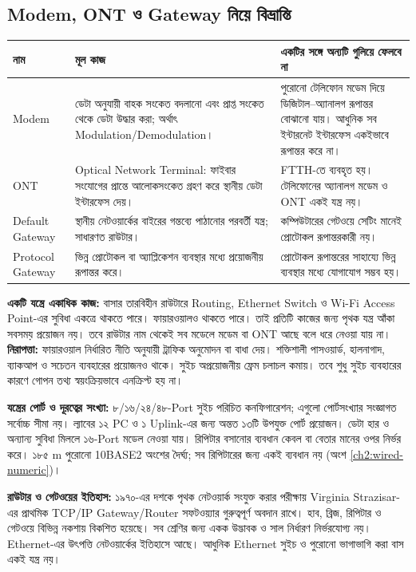 \subsection{Modem, ONT ও Gateway নিয়ে বিভ্রান্তি}
\begin{tabularx}{\linewidth}{|p{.21\linewidth}|X|X|}
\hline
\textbf{নাম} & \textbf{মূল কাজ} & \textbf{একটির সঙ্গে অন্যটি গুলিয়ে ফেলবে না}\\\hline
Modem & ডেটা অনুযায়ী বাহক সংকেত বদলানো এবং প্রাপ্ত সংকেত থেকে ডেটা উদ্ধার করা; অর্থাৎ Modulation/Demodulation। & পুরোনো টেলিফোন মডেম দিয়ে ডিজিটাল–অ্যানালগ রূপান্তর বোঝানো যায়। আধুনিক সব ইন্টারনেট ইন্টারফেস একইভাবে রূপান্তর করে না।\\\hline
ONT & Optical Network Terminal: ফাইবার সংযোগের প্রান্তে আলোকসংকেত গ্রহণ করে স্থানীয় ডেটা ইন্টারফেস দেয়। & FTTH-তে ব্যবহৃত হয়। টেলিফোনের অ্যানালগ মডেম ও ONT একই যন্ত্র নয়।\\\hline
Default Gateway & স্থানীয় নেটওয়ার্কের বাইরের গন্তব্যে পাঠানোর পরবর্তী যন্ত্র; সাধারণত রাউটার। & কম্পিউটারের গেটওয়ে সেটিং মানেই প্রোটোকল রূপান্তরকারী নয়।\\\hline
Protocol Gateway & ভিন্ন প্রোটোকল বা অ্যাপ্লিকেশন ব্যবস্থার মধ্যে প্রয়োজনীয় রূপান্তর করে। & প্রোটোকল রূপান্তরের সাহায্যে ভিন্ন ব্যবস্থার মধ্যে যোগাযোগ সম্ভব হয়।\\\hline
\end{tabularx}
\textbf{একটি যন্ত্রে একাধিক কাজ:} বাসার তারবিহীন রাউটারে Routing, Ethernet Switch ও Wi-Fi Access Point-এর সুবিধা একত্রে থাকতে পারে। ফায়ারওয়ালও থাকতে পারে। তাই প্রতিটি কাজের জন্য পৃথক যন্ত্র আঁকা সবসময় প্রয়োজন নয়। তবে রাউটার নাম থেকেই সব মডেলে মডেম বা ONT আছে বলে ধরে নেওয়া যায় না।
\textbf{নিরাপত্তা:} ফায়ারওয়াল নির্ধারিত নীতি অনুযায়ী ট্রাফিক অনুমোদন বা বাধা দেয়। শক্তিশালী পাসওয়ার্ড, হালনাগাদ, ব্যাকআপ ও সচেতন ব্যবহারের প্রয়োজনও থাকে। সুইচ অপ্রয়োজনীয় ফ্রেম চলাচল কমায়। তবে শুধু সুইচ ব্যবহারের কারণে গোপন তথ্য স্বয়ংক্রিয়ভাবে এনক্রিপ্ট হয় না।


\textbf{যন্ত্রের পোর্ট ও দূরত্বের সংখ্যা:} ৮/১৬/২৪/৪৮-Port সুইচ পরিচিত কনফিগারেশন; এগুলো পোর্টসংখ্যার সংজ্ঞাগত সর্বোচ্চ সীমা নয়। ল্যাবের ১২ PC ও ১ Uplink-এর জন্য অন্তত ১৩টি উপযুক্ত পোর্ট প্রয়োজন। ডেটা হার ও অন্যান্য সুবিধা মিললে ১৬-Port মডেল নেওয়া যায়। রিপিটার বসানোর ব্যবধান কেবল বা বেতার মানের ওপর নির্ভর করে। ১৮৫ m পুরোনো 10BASE2 অংশের দৈর্ঘ্য; সব রিপিটারের জন্য একই ব্যবধান নয় (অংশ \ref{ch2:wired-numeric})।

\textbf{রাউটার ও গেটওয়ের ইতিহাস:} ১৯৭০-এর দশকে পৃথক নেটওয়ার্ক সংযুক্ত করার পরীক্ষায় Virginia Strazisar-এর প্রাথমিক TCP/IP Gateway/Router সফটওয়্যার গুরুত্বপূর্ণ অবদান রাখে। হাব, ব্রিজ, রিপিটার ও গেটওয়ে বিভিন্ন নকশায় বিকশিত হয়েছে। সব শ্রেণির জন্য একক উদ্ভাবক ও সাল নির্ধারণ নির্ভরযোগ্য নয়। Ethernet-এর উৎপত্তি নেটওয়ার্কের ইতিহাসে আছে। আধুনিক Ethernet সুইচ ও পুরোনো ভাগাভাগি করা বাস একই যন্ত্র নয়।

